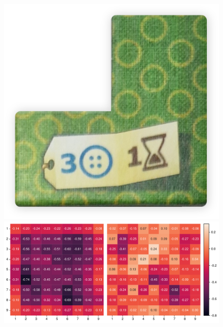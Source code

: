 \begin{figure}[!ht]
\begin{minipage}{.78\textwidth}
    \end{minipage}
    \begin{minipage}{.11\textwidth}
        \hfill
    \end{minipage}
    \vspace*{-0.32cm}
    \label{fig:action-ordering-patch-17}
\end{figure}

\vspace*{-0.36cm}

\begin{figure}[!ht]
    \centering
    \begin{minipage}{.11\textwidth}
        \centering
        \includegraphics[width=0.667\linewidth]{res/pictures/assets/21-front.png}
    \end{minipage}
    \begin{minipage}{.78\textwidth}
        \centering
        \includegraphics[width=\linewidth]{res/pictures/plots/21-action-ordering.pdf}
    \end{minipage}
    \begin{minipage}{.11\textwidth}
        \hfill
    \end{minipage}
    \vspace*{-0.32cm}
    \label{fig:action-ordering-patch-21}
\end{figure}

